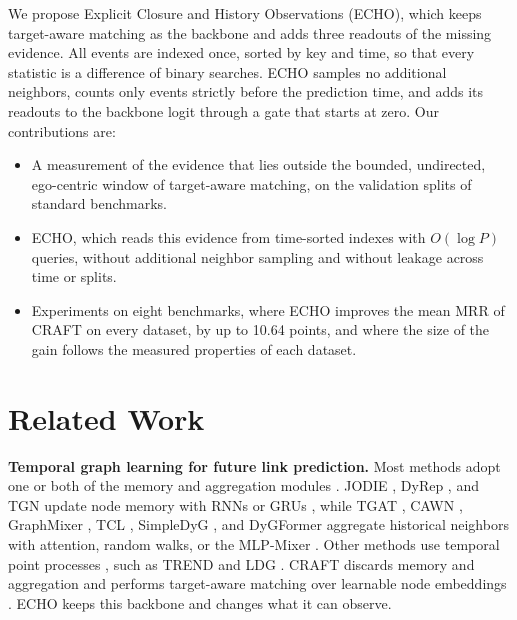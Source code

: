 \documentclass[twoside]{article}
\newcommand{\ours}{ECHO}
\begin{document}
We propose Explicit Closure and History Observations (\ours{}), which keeps target-aware matching as the backbone and adds three readouts of the missing evidence. All events are indexed once, sorted by key and time, so that every statistic is a difference of binary searches. \ours{} samples no additional neighbors, counts only events strictly before the prediction time, and adds its readouts to the backbone logit through a gate that starts at zero. Our contributions are:
\begin{itemize}
\item A measurement of the evidence that lies outside the bounded, undirected, ego-centric window of target-aware matching, on the validation splits of standard benchmarks.
\item \ours{}, which reads this evidence from time-sorted indexes with $O(\log P)$ queries, without additional neighbor sampling and without leakage across time or splits.
\item Experiments on eight benchmarks, where \ours{} improves the mean MRR of CRAFT on every dataset, by up to 10.64 points, and where the size of the gain follows the measured properties of each dataset.
\end{itemize}

\section{Related Work}

\textbf{Temporal graph learning for future link prediction.}
Most methods adopt one or both of the memory and aggregation modules \citep{skarding2021foundations,rossi2020tgn,yang2024towards}. JODIE \citep{kumar2019jodie}, DyRep \citep{trivedi2019dyrep}, and TGN \citep{rossi2020tgn} update node memory with RNNs \citep{wu2017recurrent} or GRUs \citep{cho2014learning}, while TGAT \citep{xu2020tgat}, CAWN \citep{wang2021cawn}, GraphMixer \citep{cong2023graphmixer}, TCL \citep{wang2021tcl}, SimpleDyG \citep{wu2024simpledyg}, and DyGFormer \citep{yu2023dygformer} aggregate historical neighbors with attention, random walks, or the MLP-Mixer \citep{tolstikhin2021mlp}. Other methods use temporal point processes \citep{hawkes1971spectra,mei2017neural}, such as TREND \citep{wen2022trend} and LDG \citep{knyazev2021learning}. CRAFT \citep{yi2025craft} discards memory and aggregation and performs target-aware matching over learnable node embeddings \citep{abboud2020surprising,loukas2019graph,bechler2025towards}. \ours{} keeps this backbone and changes what it can observe.
\end{document}

